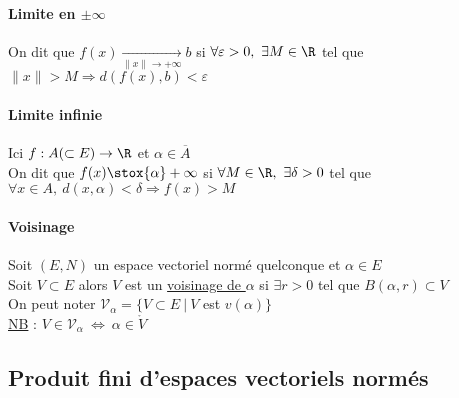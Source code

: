  		\paragraph{Limite en $\pm \infty$}
 			On dit que $f(x) \underset{\| x\|\rightarrow +\infty}{\longrightarrow} b$ si $\forall \varepsilon >0 ,~\exists M\in\R $ tel que 
 			$\| x\| > M \Rightarrow d(f(x) , b) <\varepsilon $
 		\paragraph{Limite infinie} 
 			Ici $f:A(\subset E ) \rightarrow \R$ et $\alpha\in\overline{A}$\\
 			On dit que $f(x) \stox{\alpha} +\infty $ si $\forall M\in\R ,~\exists \delta >0$ tel que 
 			$\forall x\in A ,~d(x,\alpha )<\delta \Rightarrow f(x) >M$ \traitd
 		\paragraph{Voisinage}
 			Soit $(E,N)$ un espace vectoriel normé quelconque et $\alpha\in E$ \\
 			Soit $V\subset E$ alors $V$ est un \underline{voisinage de $\alpha$} si $\exists r>0$ tel que $B(\alpha ,r) \subset V$ \\
 			On peut noter $\mathcal{V}_{\alpha} = \{V\subset E ~|~V$ est $v(\alpha )\} $ \trait \vspace*{-1.15cm} \\ 
 			{\small \underline{NB} : $V\in \mathcal{V}_{\alpha} ~\Leftrightarrow~ \alpha \in \mathring{V}$ }
 		\vspace*{0.5cm} \\ 
 		
 	\subsection{Produit fini d'espaces vectoriels normés}
 		\traitd

